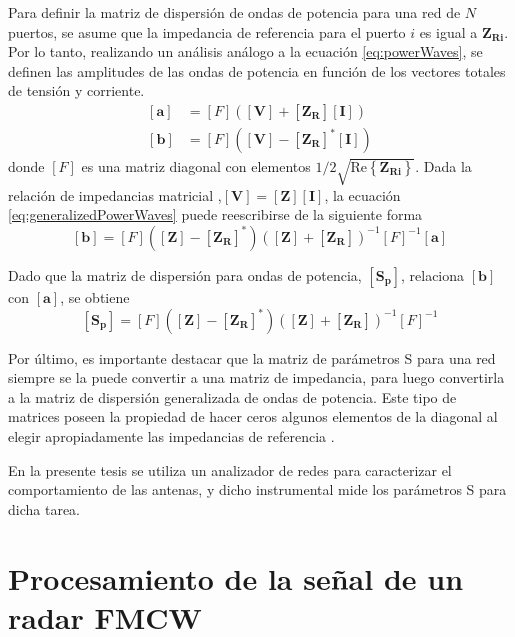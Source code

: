Para definir la matriz de dispersión de ondas de potencia para una red de $N$ puertos, se asume que la impedancia de referencia para el puerto $i$ es igual a $\bm{Z}_{\bm{Ri}}$. Por lo tanto, realizando un análisis análogo a la ecuación \ref{eq:powerWaves}, se definen las amplitudes de las ondas de potencia en función de los vectores totales de tensión y corriente.
\begin{equation}\label{eq:generalizedPowerWaves}
  \begin{aligned}
    \left[\bm{a}\right] &= [F]([\bm{V}] + [\bm{Z_R}][\bm{I}]) \\
    \left[\bm{b}\right] &= [F]([\bm{V}] - [\bm{Z_R}]^*[\bm{I}])
  \end{aligned}
\end{equation}
donde $[F]$ es una matriz diagonal con elementos $1/ 2\sqrt{\text{Re}\left\lbrace \bm{Z}_{\bm{Ri}} \right\rbrace}$. Dada la relación de impedancias matricial ,$[\bm{V}] = [\bm{Z}][\bm{I}]$, la ecuación \ref{eq:generalizedPowerWaves} puede reescribirse de la siguiente forma
\begin{equation}\label{eq:generalizedPowerWaves2}
    \left[\bm{b}\right] = [F]([\bm{Z}] - [\bm{Z_R}]^*)([\bm{Z}] + [\bm{Z_R}])^{-1}[F]^{-1}[\bm{a}]
\end{equation}

Dado que la matriz de dispersión para ondas de potencia, $[\bm{S_p}]$, relaciona $[\bm{b}]$ con $[\bm{a}]$, se obtiene
\begin{equation}
    \left[\bm{S_p}\right] = [F]([\bm{Z}] - [\bm{Z_R}]^*)([\bm{Z}] + [\bm{Z_R}])^{-1}[F]^{-1}
\end{equation}

Por último, es importante destacar que la matriz de parámetros S para una red siempre se la puede convertir a una matriz de impedancia, para luego convertirla a la matriz de dispersión generalizada de ondas de potencia. Este tipo de matrices poseen la propiedad de hacer ceros algunos elementos de la diagonal al elegir apropiadamente las impedancias de referencia \cite{Pozar2012}.

En la presente tesis se utiliza un analizador de redes para caracterizar el comportamiento de las antenas, y dicho instrumental mide los parámetros S para dicha tarea.


\section{Procesamiento de la señal de un radar FMCW}


